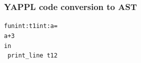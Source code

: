 \documentclass[xcolor=dvipsnames]{beamer}
\begin{document}

\begin{frame}[fragile] 
\frametitle{YAPPL code conversion to AST}
\begin{alltt} 
fun int:t1 int:a =
    a + 3
in
~print_line ~t1 2 
\end{alltt}

\end{frame}
\end{document}
